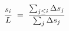 \documentclass[preview]{standalone}
\begin{document}
\begin{align*}
\special{dvisvgm:raw <g id='unique000'>}\dfrac{s_i}{L} \;=\; \dfrac{\sum_{j\le i} \Delta s_j}{\sum_{j} \Delta s_j}\special{dvisvgm:raw </g>}
\end{align*}
\end{document}
